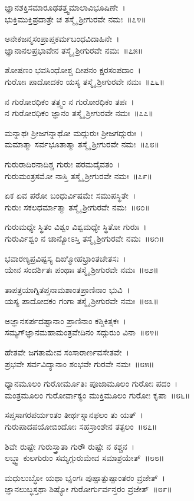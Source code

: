 ಜ್ಞಾನಶಕ್ತಿಸಮಾರೂಢತತ್ತ್ವಮಾಲಾವಿಭೂಷಿಣೇ~।\\
ಭುಕ್ತಿಮುಕ್ತಿಪ್ರದಾತ್ರೇ ಚ ತಸ್ಮೈ ಶ್ರೀಗುರವೇ ನಮಃ~॥೭೪॥

ಅನೇಕಜನ್ಮಸಂಪ್ರಾಪ್ತಕರ್ಮಬಂಧವಿದಾಹಿನೇ~।\\
ಜ್ಞಾನಾನಲಪ್ರಭಾವೇನ ತಸ್ಮೈ ಶ್ರೀಗುರವೇ ನಮಃ~॥೭೫॥

ಶೋಷಣಂ ಭವಸಿಂಧೋಶ್ಚ ದೀಪನಂ ಕ್ಷರಸಂಪದಾಂ~।\\
ಗುರೋಃ ಪಾದೋದಕಂ ಯಸ್ಯ ತಸ್ಮೈ ಶ್ರೀಗುರವೇ ನಮಃ~॥೭೬॥

ನ ಗುರೋರಧಿಕಂ ತತ್ತ್ವಂ ನ ಗುರೋರಧಿಕಂ ತಪಃ~।\\
ನ ಗುರೋರಧಿಕಂ ಜ್ಞಾನಂ ತಸ್ಮೈ ಶ್ರೀಗುರವೇ ನಮಃ~॥೭೭॥

ಮನ್ನಾಥಃ ಶ್ರೀಜಗನ್ನಾಥೋ ಮದ್ಗುರುಃ ಶ್ರೀಜಗದ್ಗುರುಃ~।\\
ಮಮಾತ್ಮಾ ಸರ್ವಭೂತಾತ್ಮಾ ತಸ್ಮೈ ಶ್ರೀಗುರವೇ ನಮಃ~॥೭೮॥

ಗುರುರಾದಿರನಾದಿಶ್ಚ ಗುರುಃ ಪರಮದೈವತಂ~।\\
ಗುರುಮಂತ್ರಸಮೋ ನಾಸ್ತಿ ತಸ್ಮೈ ಶ್ರೀಗುರವೇ ನಮಃ~॥೭೯॥

ಏಕ ಏವ ಪರೋ ಬಂಧುರ್ವಿಷಮೇ ಸಮುಪಸ್ಥಿತೇ~।\\
ಗುರುಃ ಸಕಲಧರ್ಮಾತ್ಮಾ ತಸ್ಮೈ ಶ್ರೀಗುರವೇ ನಮಃ~॥೮೦॥

ಗುರುಮಧ್ಯೇ ಸ್ಥಿತಂ ವಿಶ್ವಂ ವಿಶ್ವಮಧ್ಯೇ ಸ್ಥಿತೋ ಗುರುಃ~।\\
ಗುರುರ್ವಿಶ್ವಂ ನ ಚಾನ್ಯೋಽಸ್ತಿ ತಸ್ಮೈ ಶ್ರೀಗುರವೇ ನಮಃ~॥೮೧॥

ಭವಾರಣ್ಯಪ್ರವಿಷ್ಟಸ್ಯ ದಿಙ್ಮೋಹಭ್ರಾಂತಚೇತಸಃ~।\\
ಯೇನ ಸಂದರ್ಶಿತಃ ಪಂಥಾಃ ತಸ್ಮೈ ಶ್ರೀಗುರವೇ ನಮಃ~॥೮೨॥

ತಾಪತ್ರಯಾಗ್ನಿತಪ್ತನಾಮಶಾಂತಪ್ರಾಣಿನಾಂ ಭುವಿ~।\\
ಯಸ್ಯ ಪಾದೋದಕಂ ಗಂಗಾ ತಸ್ಮೈ ಶ್ರೀಗುರವೇ ನಮಃ~॥೮೩॥

ಅಜ್ಞಾನಸರ್ಪದಷ್ಟಾನಾಂ ಪ್ರಾಣಿನಾಂ ಕಶ್ಚಿಕಿತ್ಸಕಃ~।\\
ಸಮ್ಯಗ್‌ಜ್ಞಾನಮಹಾಮಂತ್ರವೇದಿನಂ ಸದ್ಗುರುಂ ವಿನಾ~॥೮೪॥

ಹೇತವೇ ಜಗತಾಮೇವ ಸಂಸಾರಾರ್ಣವಸೇತವೇ~।\\
ಪ್ರಭವೇ ಸರ್ವವಿದ್ಯಾನಾಂ ಶಂಭವೇ ಗುರವೇ ನಮಃ~॥೮೫॥

ಧ್ಯಾನಮೂಲಂ ಗುರೋರ್ಮೂತಿಃ ಪೂಜಾಮೂಲಂ ಗುರೋಃ ಪದಂ~।\\
ಮಂತ್ರಮೂಲಂ ಗುರೋರ್ವಾಕ್ಯಂ ಮುಕ್ತಿಮೂಲಂ ಗುರೋಃ ಕೃಪಾ~॥೮೬॥

ಸಪ್ತಸಾಗರಪರ್ಯಂತಂ ತೀರ್ಥಸ್ನಾನಫಲಂ ತು ಯತ್~।\\
ಗುರುಪಾದಪಯೋಬಿಂದೋಃ ಸಹಸ್ರಾಂಶೇನ ತತ್ಫಲಂ~॥೮೭॥

ಶಿವೇ ರುಷ್ಟೇ ಗುರುಸ್ತ್ರಾತಾ ಗುರೌ ರುಷ್ಟೇ ನ ಕಶ್ಚನ~।\\
ಲಬ್ಧ್ವಾ ಕುಲಗುರುಂ ಸಮ್ಯಗ್ಗುರುಮೇವ ಸಮಾಶ್ರಯೇತ್~॥೮೮॥

ಮಧುಲುಬ್ಧೋ ಯಥಾ ಭೃಂಗಃ ಪುಷ್ಪಾತ್ಪುಷ್ಪಾಂತರಂ ವ್ರಜೇತ್~।\\
ಜ್ಞಾನಲುಬ್ಧಸ್ತಥಾ ಶಿಷ್ಯೋ ಗುರೋರ್ಗುರ್ವನ್ತರಂ ವ್ರಜೇತ್~॥೮೯॥

